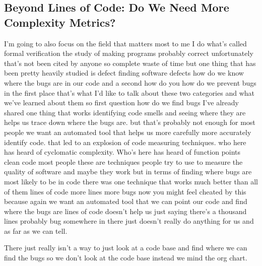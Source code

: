 \documentclass[conference, compsoc, twoside]{IEEEtran}
\begin{document}
\subsection{Beyond Lines of Code: Do We Need More Complexity Metrics?}
I'm going to also focus on the field that matters
most to me I do what's called formal verification the study of making
programs probably correct unfortunately
that's not been cited by anyone so
complete waste of time but one thing
that has been pretty heavily studied is
defect finding software defects how do
we know where the bugs are in our code
and a second how do you how do we
prevent bugs in the first place
that's what I'd like to talk about these two categories and what we've learned
about them so first question how do we
find bugs I've already shared one thing
that works identifying code smells and
seeing where they are helps us trace down where the bugs are. but that's probably not enough for most people we want an automated tool that helps us more carefully more accurately identify code. that led to an explosion of code measuring techniques.
who here has heard of cyclomatic complexity.
Who's here has heard of function points clean code most
people these are techniques people try
to use to measure the quality of
software and maybe they work but in
terms of finding where bugs are most
likely to be in code there was one
technique that works much better than
all of them lines of code more lines
more bugs now you might feel cheated by this
because again we want an automated tool
that we can point our code and find
where the bugs are lines of code doesn't
help us just saying there's a thousand
lines probably bug somewhere in there
just doesn't really do anything for us
and as far as we can tell.

There just really isn't a way to just look at a code base and find where we can find the bugs so we don't look at the code base instead we mind the org chart. 
\end{document}
